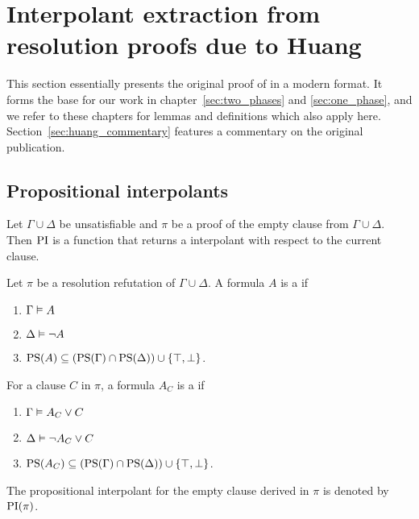 
\chapter{Interpolant extraction from resolution proofs due to Huang}  
\label{sec:huang}

This section essentially presents the original proof of \cite{Huang95} in a modern format.
It forms the base for our work in chapter~\ref{sec:two_phases} and \ref{sec:one_phase}, and we refer to these chapters for lemmas and definitions which also apply here.
Section~\ref{sec:huang_commentary} features a commentary on the original publication. 

\section{Propositional interpolants}


Let $\Gamma \cup \Delta$ be unsatisfiable and $\pi$ be a proof of the empty clause from $\Gamma \cup \Delta$. Then $\operatorname{PI}$ is a function that returns a interpolant with respect to the current clause. 

\begin{defi}
	Let $\pi$ be a resolution refutation of $\Gamma \cup \Delta$.
	A formula $A$ is a  if
	\label{def:huang_orig_rel_prop_interpol}
	\begin{enumerate}
		\item $\Gamma \vDash A$
			\label{huang_orig_rel_prop_interpol_cond1}
		\item $\Delta \vDash \lnot A$
			\label{huang_orig_rel_prop_interpol_cond2}
		\item $\operatorname{PS}(A) \subseteq (\operatorname{PS}(\Gamma) \cap \operatorname{PS}(\Delta)) \cup \{\top, \bot\} $.
			\label{huang_orig_rel_prop_interpol_cond_lang}
	\end{enumerate}


	For a clause $C$ in $\pi$, a formula $A_C$ is a  if
	\begin{enumerate}
		\item $\Gamma \vDash A_C \lor C$
		\item $\Delta \vDash \lnot A_C \lor C$
		\item $\operatorname{PS}(A_C) \subseteq (\operatorname{PS}(\Gamma) \cap \operatorname{PS}(\Delta)) \cup \{\top, \bot\} $.
	\end{enumerate}

	The propositional interpolant for the empty clause derived in $\pi$ is denoted by $\operatorname{PI}(\pi)$.\qedhere
\end{defi}

